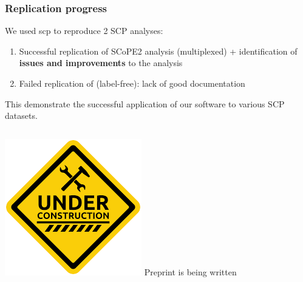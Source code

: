 \documentclass{beamer}
\newcommand{\hcode}[2][lgray]{{\ttfamily\color{vdgray}\colorbox{#1}{#2}}}
\begin{document}
\begin{frame}
  \frametitle{Replication progress}
  
  We used \hcode{scp} to reproduce 2 SCP analyses:
  
  \vfill
  \begin{enumerate}
    \item Successful replication of SCoPE2 analysis (multiplexed) + 
    identification of \textbf{issues and improvements} to the analysis
    \item Failed replication of \cite{Zhu2019-ja} (label-free): lack 
    of good documentation
  \end{enumerate}
  
  \vfill
  This demonstrate the successful application of our software to 
  various SCP datasets. 
  
  \vfill
  \begin{columns}
    \raggedleft
    \includegraphics[width=\linewidth]{figs/under_construction.png}
    Preprint is being written
  \end{columns}
  
\end{frame}
\end{document}
